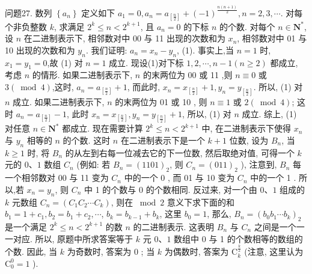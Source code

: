 问题27. 数列 $\left\{a_n\right\}$ 定义如下 $a_1=0, a_n=a_{\left[\frac{n}{2}\right]}+(-1)^{\frac{n(n+1)}{2}}, n=2,3, \cdots$. 对每个非负整数 $k$, 求满足 $2^k \leqslant n<2^{k+1}$, 且 $a_n=0$ 的下标 $n$ 的个数.
对每个 $n \in \mathbf{N}^*$, 设 $n$ 在二进制表示下, 相邻数对中 00 与 11 出现的次数和为 $x_n$, 相邻数对中 01 与 10 出现的次数和为 $y_n$. 我们证明: $a_n=x_n-y_n$, (1).
事实上,当 $n=1$ 时, $x_1=y_1=0$,故 (1) 对 $n=1$ 成立.
现设(1)对下标 $1,2, \cdots, n-1(n \geqslant 2)$ 都成立, 考虑 $n$ 的情形.
如果二进制表示下, $n$ 的末两位为 00 或 11 ,则 $n \equiv 0$ 或 $3(\bmod 4)$,这时, $a_n=a_{\left[\frac{n}{2}\right]}+1$, 而此时, $x_n=x_{\left[\frac{n}{2}\right]}+1, y_n=y_{\left[\frac{n}{2}\right]}$. 所以, (1) 对 $n$ 成立.
如果二进制表示下, $n$ 的末两位为 01 或 10 , 则 $n \equiv 1$ 或 $2(\bmod 4)$; 这时 $a_n=a_{\left[\frac{n}{2}\right]}-1$, 此时 $x_n=x_{\left[\frac{n}{2}\right]}, y_n=y_{\left[\frac{n}{2}\right]}+1$, 所以, (1) 对 $n$ 成立.
综上, (1) 对任意 $n \in \mathbf{N}^*$ 都成立.
现在需要计算 $2^k \leqslant n<2^{k+1}$ 中, 在二进制表示下使得 $x_n$ 与 $y_n$ 相等的 $n$ 的个数.
这时 $n$ 在二进制表示下是一个 $k+1$ 位数, 设为 $B_n$, 当 $k \geqslant 1$ 时, 将 $B_n$ 的从左到右每一位减去它的下一位数, 然后取绝对值, 可得一个 $k$ 元的 $0 、 1$ 数组 $C_n$ (例如: 若 $B_n=(1101)_2$, 则 $C_n=(011)_2$ ), 注意到, $B_n$ 每一个相邻数对 00 与 11 变为 $C_n$ 中的一个 0 , 而 01 与 10 变为 $C_n$ 中的一个 1 . 所以,若 $x_n=y_n$, 则 $C_n$ 中 1 的个数与 0 的个数相同.
反过来, 对一个由 $0 、 1$ 组成的 $k$ 元数组 $C_n=\left(C_1 C_2 \cdots C_k\right)$, 则在 $\bmod 2$ 意义下求下面的和 $b_1=1+c_1, b_2=b_1+c_2, \cdots$, $b_k=b_{k-1}+b_k$, 这里 $b_0=1$, 那么, $B_n=\left(b_0 b_1 \cdots b_k\right)_2$ 是一个满足 $2^k \leqslant n<2^{k+1}$ 的数 $n$ 的二进制表示.
这表明 $B_n$ 与 $C_n$ 之间是一个一一对应.
所以, 原题中所求答案等于 $k$ 元 $0 、 1$ 数组中 0 与 1 的个数相等的数组的个数.
因此,
当 $k$ 为奇数时, 答案为 0 ; 当 $k$ 为偶数时, 答案为 $\mathrm{C}_k^{\frac{k}{2}}$ (注意, 这里认为 $\mathrm{C}_0^0=1$ ).



